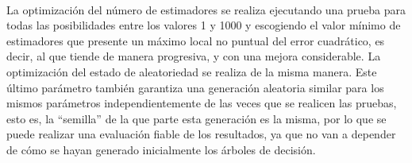 \\
\par La optimización del número de estimadores se realiza ejecutando una prueba para todas las posibilidades entre los valores 1 y 1000 y escogiendo el valor mínimo de estimadores que presente un máximo local no puntual del error cuadrático, es decir, al que tiende de manera progresiva, y con una mejora considerable. La optimización del estado de aleatoriedad se realiza de la misma manera. Este último parámetro también garantiza una generación aleatoria similar para los mismos parámetros independientemente de las veces que se realicen las pruebas, esto es, la ``semilla'' de la que parte esta generación es la misma, por lo que se puede realizar una evaluación fiable de los resultados, ya que no van a depender de cómo se hayan generado inicialmente los árboles de decisión. 
